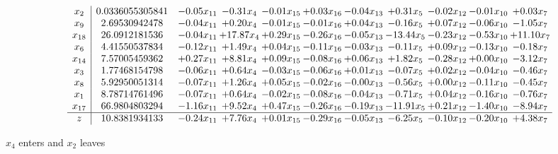 \documentclass[9pt]{article}
\begin{document}
 \[\begin{array}{c| c c@{\hskip 2pt} c@{\hskip 2pt} c@{\hskip 2pt} c@{\hskip 2pt} c@{\hskip 2pt} c@{\hskip 2pt} c@{\hskip 2pt} c@{\hskip 2pt} c@{\hskip 2pt} }
 x_{2}   &  0.0336055305841 & -0.05 x_{11} & -0.31 x_{4} & -0.01 x_{15} & +  0.03 x_{16} & -0.04 x_{13} & +  0.31 x_{5} & -0.02 x_{12} & -0.01 x_{10} & +  0.03 x_{7}\\
 x_{9}   &  2.69530942478 & -0.04 x_{11} & +  0.20 x_{4} & -0.01 x_{15} & -0.01 x_{16} & +  0.04 x_{13} & -0.16 x_{5} & +  0.07 x_{12} & -0.06 x_{10} & -1.05 x_{7}\\
 x_{18}   &  26.0912181536 & -0.04 x_{11} & + 17.87 x_{4} & +  0.29 x_{15} & -0.26 x_{16} & -0.05 x_{13} & -13.44 x_{5} & -0.23 x_{12} & -0.53 x_{10} & + 11.10 x_{7}\\
 x_{6}   &  4.41550537834 & -0.12 x_{11} & +  1.49 x_{4} & +  0.04 x_{15} & -0.11 x_{16} & -0.03 x_{13} & -0.11 x_{5} & +  0.09 x_{12} & -0.13 x_{10} & -0.18 x_{7}\\
 x_{14}   &  7.57005459362 & +  0.27 x_{11} & +  8.81 x_{4} & +  0.09 x_{15} & -0.08 x_{16} & +  0.06 x_{13} & +  1.82 x_{5} & -0.28 x_{12} & +  0.00 x_{10} & -3.12 x_{7}\\
 x_{3}   &  1.77468154798 & -0.06 x_{11} & +  0.64 x_{4} & -0.03 x_{15} & -0.06 x_{16} & +  0.01 x_{13} & -0.07 x_{5} & +  0.02 x_{12} & -0.04 x_{10} & -0.46 x_{7}\\
 x_{8}   &  5.92950051314 & -0.07 x_{11} & +  1.26 x_{4} & +  0.05 x_{15} & -0.02 x_{16} & -0.00 x_{13} & -0.56 x_{5} & +  0.00 x_{12} & -0.11 x_{10} & -0.45 x_{7}\\
 x_{1}   &  8.78714761496 & -0.07 x_{11} & +  0.64 x_{4} & -0.02 x_{15} & -0.08 x_{16} & -0.04 x_{13} & -0.71 x_{5} & +  0.04 x_{12} & -0.16 x_{10} & -0.76 x_{7}\\
 x_{17}   &  66.9804803294 & -1.16 x_{11} & +  9.52 x_{4} & +  0.47 x_{15} & -0.26 x_{16} & -0.19 x_{13} & -11.91 x_{5} & +  0.21 x_{12} & -1.40 x_{10} & -8.94 x_{7}\\
\hline
z    &  10.8381934133 & -0.24 x_{11} & +  7.76 x_{4} & +  0.01 x_{15} & -0.29 x_{16} & -0.05 x_{13} & -6.25 x_{5} & -0.10 x_{12} & -0.20 x_{10} & +  4.38 x_{7}\\
\end{array}\]


 $ x_{4} $ enters and $ x_{2} $ leaves 
\end{document}
